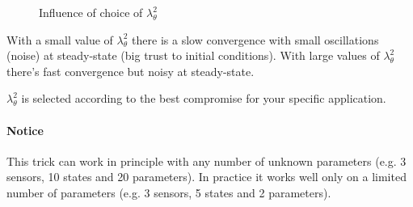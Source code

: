 \begin{figure}[H]
    \centering
    \caption*{Influence of choice of $\lambda_\theta^2$}
\end{figure}

With a small value of $\lambda_\theta^2$ there is a slow convergence with small oscillations (noise) at steady-state (big trust to initial conditions).
With large values of $\lambda_\theta^2$ there's fast convergence but noisy at steady-state.

$\lambda_\theta^2$ is selected according to the best compromise for your specific application.

\paragraph{Notice} This trick can work in principle with any number of unknown parameters (e.g. 3 sensors, 10 states and 20 parameters).
In practice it works well only on a limited number of parameters (e.g. 3 sensors, 5 states and 2 parameters).


